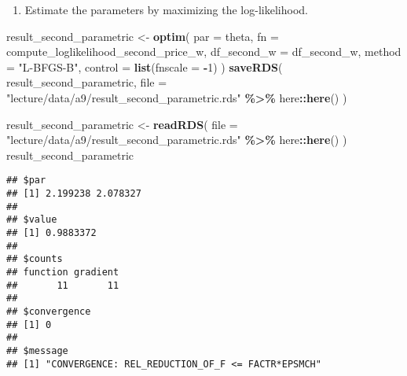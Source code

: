 \documentclass[
]{book}
\newenvironment{Shaded}{\begin{snugshade}}{\end{snugshade}}
\newcommand{\AttributeTok}[1]{\textcolor[rgb]{0.13,0.29,0.53}{#1}}
\newcommand{\DecValTok}[1]{\textcolor[rgb]{0.00,0.00,0.81}{#1}}
\newcommand{\FunctionTok}[1]{\textcolor[rgb]{0.13,0.29,0.53}{\textbf{#1}}}
\newcommand{\NormalTok}[1]{#1}
\newcommand{\OtherTok}[1]{\textcolor[rgb]{0.56,0.35,0.01}{#1}}
\newcommand{\SpecialCharTok}[1]{\textcolor[rgb]{0.81,0.36,0.00}{\textbf{#1}}}
\newcommand{\StringTok}[1]{\textcolor[rgb]{0.31,0.60,0.02}{#1}}
\providecommand{\tightlist}{%
  \setlength{\itemsep}{0pt}\setlength{\parskip}{0pt}}
\begin{document}
\begin{enumerate}
\def\labelenumi{\arabic{enumi}.}
\setcounter{enumi}{3}
\tightlist
\item
  Estimate the parameters by maximizing the log-likelihood.
\end{enumerate}

\begin{Shaded}
\begin{Highlighting}[]
\NormalTok{result\_second\_parametric }\OtherTok{\textless{}{-}}
  \FunctionTok{optim}\NormalTok{(}
    \AttributeTok{par =}\NormalTok{ theta,}
    \AttributeTok{fn =}\NormalTok{ compute\_loglikelihood\_second\_price\_w,}
    \AttributeTok{df\_second\_w =}\NormalTok{ df\_second\_w,}
    \AttributeTok{method =} \StringTok{"L{-}BFGS{-}B"}\NormalTok{,}
    \AttributeTok{control =} \FunctionTok{list}\NormalTok{(}\AttributeTok{fnscale =} \SpecialCharTok{{-}}\DecValTok{1}\NormalTok{)}
\NormalTok{  )}
\FunctionTok{saveRDS}\NormalTok{(}
\NormalTok{  result\_second\_parametric, }
  \AttributeTok{file =} \StringTok{"lecture/data/a9/result\_second\_parametric.rds"} \SpecialCharTok{\%\textgreater{}\%}\NormalTok{ here}\SpecialCharTok{::}\FunctionTok{here}\NormalTok{()}
\NormalTok{)}
\end{Highlighting}
\end{Shaded}

\begin{Shaded}
\begin{Highlighting}[]
\NormalTok{result\_second\_parametric }\OtherTok{\textless{}{-}} 
  \FunctionTok{readRDS}\NormalTok{(}
    \AttributeTok{file =} \StringTok{"lecture/data/a9/result\_second\_parametric.rds"} \SpecialCharTok{\%\textgreater{}\%}\NormalTok{ here}\SpecialCharTok{::}\FunctionTok{here}\NormalTok{()}
\NormalTok{  )}
\NormalTok{result\_second\_parametric}
\end{Highlighting}
\end{Shaded}

\begin{verbatim}
## $par
## [1] 2.199238 2.078327
## 
## $value
## [1] 0.9883372
## 
## $counts
## function gradient 
##       11       11 
## 
## $convergence
## [1] 0
## 
## $message
## [1] "CONVERGENCE: REL_REDUCTION_OF_F <= FACTR*EPSMCH"
\end{verbatim}

\begin{Shaded}
\end{Shaded}
\end{document}
